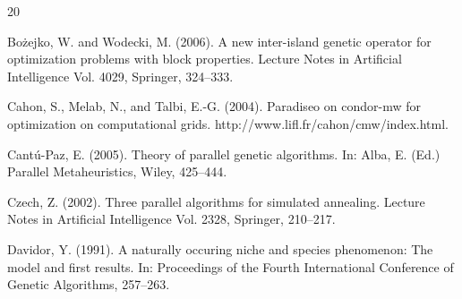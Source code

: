 \begin{thebibliography}{20}




Bo\.{z}ejko, W. and Wodecki, M. (2006).
A new inter-island genetic operator for optimization problems with
block properties.   Lecture Notes in Artificial Intelligence Vol. 4029, Springer, 324--333. 

Cahon, S., Melab, N., and Talbi, E.-G. (2004).
Paradiseo on condor-mw for optimization on computational grids.
{http://www.lifl.fr/\linebreak {\textasciitilde{}}cahon/cmw/index.html}.

Cant\'{u}-Paz, E. (2005).
Theory of parallel genetic algorithms.
In: Alba, E. (Ed.) Parallel Metaheuristics, Wiley, 425--444.
 
Czech, Z. (2002).
Three parallel algorithms for simulated annealing.
Lecture Notes in Artificial Intelligence Vol. 2328, Springer, 210--217. 

Davidor, Y. (1991).
A naturally occuring niche and species phenomenon: The model and first results.
In:  Proceedings of the Fourth International Conference of Genetic
Algorithms, 257--263.
  
\end{thebibliography}
